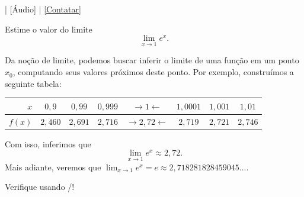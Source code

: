 \begin{flushright}
  [Vídeo] | [Áudio] | \href{https://phkonzen.github.io/notas/contato.html}{[Contatar]}
\end{flushright}

\begin{exeresol}
  Estime o valor do limite
  \begin{equation}
    \lim_{x\to 1} e^x.
  \end{equation}
\end{exeresol}
\begin{resol}
  Da noção de limite, podemos buscar inferir o limite de uma função em um ponto $x_0$, computando seus valores próximos deste ponto. Por exemplo, construímos a seguinte tabela:
  
  \begin{tabular}{r|ccc|c|ccc}
    $x$ & $0,9$ & $0,99$ & $0,999$ & $\rightarrow 1 \leftarrow$ & $1,0001$ & $1,001$ & $1,01$\\\hline
    $f(x)$ & $2,460$ & $2,691$ & $2,716$ & $\rightarrow 2,72 \leftarrow$ & $2,719$ & $2,721$ & $2,746$
  \end{tabular}
  
  Com isso, inferimos que
  \begin{equation}
    \lim_{x\to 1} e^x \approx 2,72.
  \end{equation}
  Mais adiante, veremos que $\lim_{x\to 1} e^x = e \approx 2,718281828459045 ...$.
  
  \ifispython
  Verifique usando {\python}/{\sympy}!
  \fi
\end{resol}

